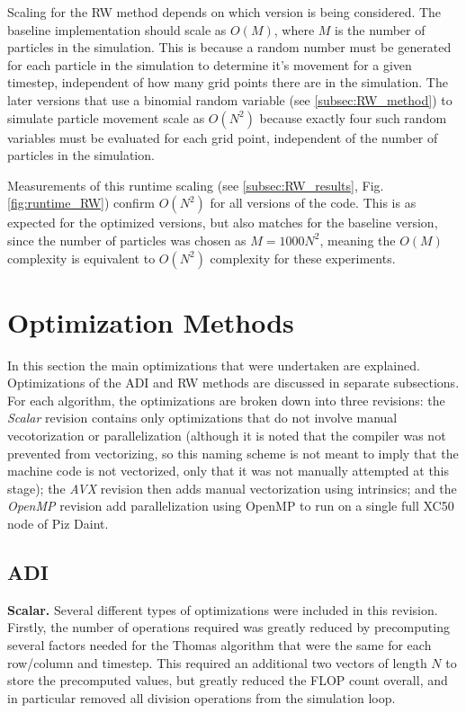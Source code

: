 \documentclass[letterpaper]{article}
\newcommand{\mypar}[1]{{\bf #1.}}
\begin{document}
Scaling for the RW method depends on which version is being considered. The baseline implementation should scale as $O(M)$, where $M$ is the number of particles in the simulation. This is because a random number must be generated for each particle in the simulation to determine it's movement for a given timestep, independent of how many grid points there are in the simulation. The later versions that use a binomial random variable (see \ref{subsec:RW_method}) to simulate particle movement scale as $O(N^2)$ because exactly four such random variables must be evaluated for each grid point, independent of the number of particles in the simulation.

Measurements of this runtime scaling (see \ref{subsec:RW_results}, Fig. \ref{fig:runtime_RW}) confirm $O(N^2)$ for all versions of the code. This is as expected for the optimized versions, but also matches for the baseline version, since the number of particles was chosen as $M=1000N^2$, meaning the $O(M)$ complexity is equivalent to $O(N^2)$ complexity for these experiments.


\section{Optimization Methods}\label{sec:method}

In this section the main optimizations that were undertaken are explained. Optimizations of the ADI and RW methods are discussed in separate subsections. For each algorithm, the optimizations are broken down into three revisions: the \textit{Scalar} revision contains only optimizations that do not involve manual vecotorization or parallelization (although it is noted that the compiler was not prevented from vectorizing, so this naming scheme is not meant to imply that the machine code is not vectorized, only that it was not manually attempted at this stage); the \textit{AVX} revision then adds manual vectorization using intrinsics; and the \textit{OpenMP} revision add parallelization using OpenMP to run on a single full XC50 node of Piz Daint.

\subsection{ADI}\label{subsec:ADI_method}

\mypar{Scalar}
Several different types of optimizations were included in this revision. Firstly, the number of operations required was greatly reduced by precomputing several factors needed for the Thomas algorithm that were the same for each row/column and timestep. This required an additional two vectors of length $N$ to store the precomputed values, but greatly reduced the FLOP count overall, and in particular removed all division operations from the simulation loop.
\end{document}
